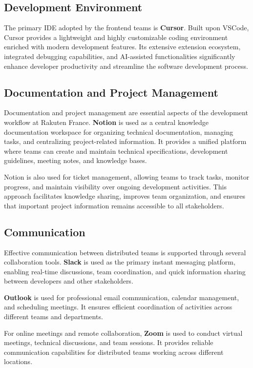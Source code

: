 \subsection{Development Environment}

The primary \ac{IDE} adopted by the frontend teams is \textbf{Cursor}. Built upon \acf{VSCode}, Cursor provides a lightweight and highly customizable coding environment enriched with modern development features. Its extensive extension ecosystem, integrated debugging capabilities, and \acs{AI}-assisted functionalities significantly enhance developer productivity and streamline the software development process.

\subsection{Documentation and Project Management}

Documentation and project management are essential aspects of the development workflow at Rakuten France. \textbf{Notion} is used as a central knowledge documentation workspace for organizing technical documentation, managing tasks, and centralizing project-related information. It provides a unified platform where teams can create and maintain technical specifications, development guidelines, meeting notes, and knowledge bases.

Notion is also used for ticket management, allowing teams to track tasks, monitor progress, and maintain visibility over ongoing development activities. This approach facilitates knowledge sharing, improves team organization, and ensures that important project information remains accessible to all stakeholders.

\subsection{Communication}

Effective communication between distributed teams is supported through several collaboration tools. \textbf{Slack} is used as the primary instant messaging platform, enabling real-time discussions, team coordination, and quick information sharing between developers and other stakeholders.

\textbf{Outlook} is used for professional email communication, calendar management, and scheduling meetings. It ensures efficient coordination of activities across different teams and departments.

For online meetings and remote collaboration, \textbf{Zoom} is used to conduct virtual meetings, technical discussions, and team sessions. It provides reliable communication capabilities for distributed teams working across different locations.


